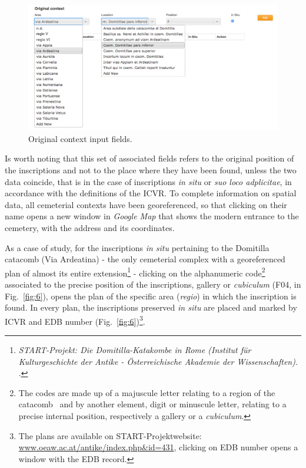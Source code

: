 \documentclass[amsthm,ebook]{saparticle}
\begin{document}
\begin{figure}[hbp]
\centering
 \includegraphics[width=\columnwidth]{EAGLE2016Roccoengrev-img005.jpg} 
\caption{Original context input fields.}
\label{fig:5}
\end{figure}





Is worth noting that this set of associated fields refers to the original position of the inscriptions and not to the
place where they have been found, unless the two data coincide, that is in the case of inscriptions \emph{in situ} or \emph{suo loco
adplicitae}, in accordance with the definitions of the ICVR.
\newpage
To complete information on spatial data, all cemeterial contexts have been georeferenced, so that clicking on their name
opens a new window in \emph{Google Map} that shows the modern entrance to the cemetery, with the address and its coordinates. 

As a case of study, for the inscriptions \emph{in situ} pertaining to the Domitilla catacomb (Via Ardeatina) - the only
cemeterial complex with a georeferenced plan of almost its entire extension\footnote{\emph{START-Projekt: Die
Domitilla-Katakombe in Rome (Institut für Kulturgeschichte der Antike - Österreichische Akademie der Wissenschaften)}.
\citet{orlandi_case_2014}.} - clicking on the alphanumeric code\footnote{ The codes are made up of a majuscule letter
relating to a region of the catacomb \ and by another element, digit or minuscule letter, relating to a precise
internal position, respectively a gallery or a \emph{cubiculum}. } associated to the precise position of the inscriptions,
gallery or \emph{cubiculum} (F04, in Fig.~\ref{fig:6}), opens the plan of the specific area (\emph{regio}) in which the inscription is found.
In every plan, the inscriptions preserved \emph{in situ} are placed and marked by ICVR and EDB number (Fig.~\ref{fig:6})\footnote{The
plans are available on START-Projektwebsite: \url{www.oeaw.ac.at/antike/index.php\&id=431}, clicking on EDB number opens a
window with the EDB record. }.
\end{document}
